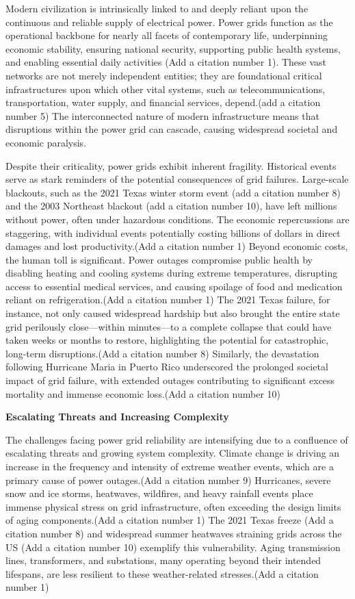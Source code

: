 \documentclass[10pt,twocolumn,letterpaper]{article}
\begin{document}
Modern civilization is intrinsically linked to and deeply reliant upon the continuous and reliable supply of electrical power. Power grids function as the operational backbone for nearly all facets of contemporary life, underpinning economic stability, ensuring national security, supporting public health systems, and enabling essential daily activities \cite{number1}(Add a citation number 1). These vast networks are not merely independent entities; they are foundational critical infrastructures upon which other vital systems, such as telecommunications, transportation, water supply, and financial services, depend.(add a citation number 5) The interconnected nature of modern infrastructure means that disruptions within the power grid can cascade, causing widespread societal and economic paralysis.

Despite their criticality, power grids exhibit inherent fragility. Historical events serve as stark reminders of the potential consequences of grid failures. Large-scale blackouts, such as the 2021 Texas winter storm event (add a citation number 8) and the 2003 Northeast blackout (add a citation number 10), have left millions without power, often under hazardous conditions. The economic repercussions are staggering, with individual events potentially costing billions of dollars in direct damages and lost productivity.(Add a citation number 1) Beyond economic costs, the human toll is significant. Power outages compromise public health by disabling heating and cooling systems during extreme temperatures, disrupting access to essential medical services, and causing spoilage of food and medication reliant on refrigeration.(Add a citation number 1) The 2021 Texas failure, for instance, not only caused widespread hardship but also brought the entire state grid perilously close—within minutes—to a complete collapse that could have taken weeks or months to restore, highlighting the potential for catastrophic, long-term disruptions.(Add a citation number 8) Similarly, the devastation following Hurricane Maria in Puerto Rico underscored the prolonged societal impact of grid failure, with extended outages contributing to significant excess mortality and immense economic loss.(Add a citation number 10)

\textbf{Escalating Threats and Increasing Complexity}

The challenges facing power grid reliability are intensifying due to a confluence of escalating threats and growing system complexity. Climate change is driving an increase in the frequency and intensity of extreme weather events, which are a primary cause of power outages.(Add a citation number 9) Hurricanes, severe snow and ice storms, heatwaves, wildfires, and heavy rainfall events place immense physical stress on grid infrastructure, often exceeding the design limits of aging components.(Add a citation number 1) The 2021 Texas freeze (Add a citation number 8) and widespread summer heatwaves straining grids across the US (Add a citation number 10) exemplify this vulnerability. Aging transmission lines, transformers, and substations, many operating beyond their intended lifespans, are less resilient to these weather-related stresses.(Add a citation number 1)
\end{document}
